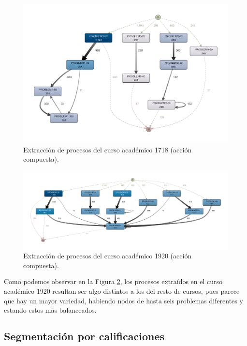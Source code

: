 \begin{figure}[H]
    \centering
    \includegraphics[width=1.25\textwidth]{imagenes/DISCO_compound/Year1718.png}
    \caption{Extracción de procesos del curso académico 1718 (acción compuesta).}
    \label{fig:año1718}
\end{figure}

\begin{figure}[H]
    \centering
    \includegraphics[width=1.25\textwidth]{imagenes/DISCO_compound/Year1920.png}
    \caption{Extracción de procesos del curso académico 1920 (acción compuesta).}
    \label{fig:año1920}
\end{figure}

Como podemos observar en la Figura \ref{fig:año1920}, los procesos extraídos en el curso académico 1920 resultan ser algo distintos a los del resto de cursos, pues parece que hay un mayor variedad, habiendo nodos de hasta seis problemas diferentes y estando estos más balanceados.

\subsection{Segmentación por calificaciones}

